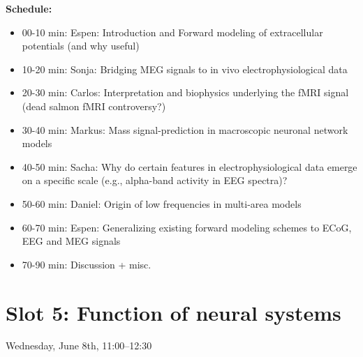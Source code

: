 \documentclass[10pt, a4paper,twoside,american]{article}
\begin{document}
\begin{enumerate}[resume]
  {\bf Schedule:}
  \begin{itemize}
  \item 00-10 min: Espen: Introduction and Forward modeling of extracellular potentials (and why useful)
  \item 10-20 min: Sonja: Bridging MEG signals to in vivo electrophysiological data
  \item 20-30 min: Carlos: Interpretation and biophysics underlying the fMRI signal (dead salmon fMRI controversy?) 
  \item 30-40 min: Markus: Mass signal-prediction in macroscopic neuronal network models
  \item 40-50 min: Sacha: Why do certain features in electrophysiological data emerge on a specific scale (e.g., alpha-band activity in EEG spectra)?
  \item 50-60 min: Daniel: Origin of low frequencies in multi-area models
  \item 60-70 min: Espen: Generalizing existing forward modeling schemes to ECoG, EEG and MEG signals
  \item 70-90 min: Discussion + misc.
  \end{itemize}
\end{enumerate}

\section*{Slot 5: Function of neural systems}
Wednesday, June 8th, 11:00--12:30
\end{document}
